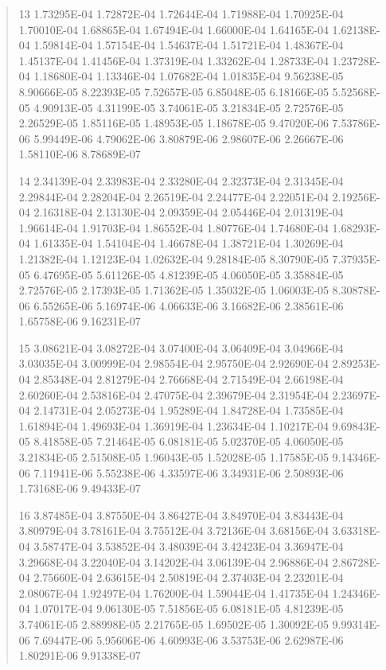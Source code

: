 \documentclass[letterpaper,10pt,english]{sphinxmanual}
\begin{document}
\begin{quote}
\begin{DUlineblock}{0em}
\item[] 13   1.73295E-04  1.72872E-04  1.72644E-04  1.71988E-04  1.70925E-04  1.70010E-04  1.68865E-04  1.67494E-04  1.66000E-04  1.64165E-04  1.62138E-04  1.59814E-04  1.57154E-04  1.54637E-04  1.51721E-04  1.48367E-04  1.45137E-04  1.41456E-04  1.37319E-04  1.33262E-04  1.28733E-04  1.23728E-04  1.18680E-04  1.13346E-04  1.07682E-04  1.01835E-04  9.56238E-05  8.90666E-05  8.22393E-05  7.52657E-05  6.85048E-05  6.18166E-05  5.52568E-05  4.90913E-05  4.31199E-05  3.74061E-05  3.21834E-05  2.72576E-05  2.26529E-05  1.85116E-05  1.48953E-05  1.18678E-05  9.47020E-06  7.53786E-06  5.99449E-06  4.79062E-06  3.80879E-06  2.98607E-06  2.26667E-06  1.58110E-06  8.78689E-07
\item[] 14   2.34139E-04  2.33983E-04  2.33280E-04  2.32373E-04  2.31345E-04  2.29844E-04  2.28204E-04  2.26519E-04  2.24477E-04  2.22051E-04  2.19256E-04  2.16318E-04  2.13130E-04  2.09359E-04  2.05446E-04  2.01319E-04  1.96614E-04  1.91703E-04  1.86552E-04  1.80776E-04  1.74680E-04  1.68293E-04  1.61335E-04  1.54104E-04  1.46678E-04  1.38721E-04  1.30269E-04  1.21382E-04  1.12123E-04  1.02632E-04  9.28184E-05  8.30790E-05  7.37935E-05  6.47695E-05  5.61126E-05  4.81239E-05  4.06050E-05  3.35884E-05  2.72576E-05  2.17393E-05  1.71362E-05  1.35032E-05  1.06003E-05  8.30878E-06  6.55265E-06  5.16974E-06  4.06633E-06  3.16682E-06  2.38561E-06  1.65758E-06  9.16231E-07
\item[] 15   3.08621E-04  3.08272E-04  3.07400E-04  3.06409E-04  3.04966E-04  3.03035E-04  3.00999E-04  2.98554E-04  2.95750E-04  2.92690E-04  2.89253E-04  2.85348E-04  2.81279E-04  2.76668E-04  2.71549E-04  2.66198E-04  2.60260E-04  2.53816E-04  2.47075E-04  2.39679E-04  2.31954E-04  2.23697E-04  2.14731E-04  2.05273E-04  1.95289E-04  1.84728E-04  1.73585E-04  1.61894E-04  1.49693E-04  1.36919E-04  1.23634E-04  1.10217E-04  9.69843E-05  8.41858E-05  7.21464E-05  6.08181E-05  5.02370E-05  4.06050E-05  3.21834E-05  2.51508E-05  1.96043E-05  1.52028E-05  1.17585E-05  9.14346E-06  7.11941E-06  5.55238E-06  4.33597E-06  3.34931E-06  2.50893E-06  1.73168E-06  9.49433E-07
\item[] 16   3.87485E-04  3.87550E-04  3.86427E-04  3.84970E-04  3.83443E-04  3.80979E-04  3.78161E-04  3.75512E-04  3.72136E-04  3.68156E-04  3.63318E-04  3.58747E-04  3.53852E-04  3.48039E-04  3.42423E-04  3.36947E-04  3.29668E-04  3.22040E-04  3.14202E-04  3.06139E-04  2.96886E-04  2.86728E-04  2.75660E-04  2.63615E-04  2.50819E-04  2.37403E-04  2.23201E-04  2.08067E-04  1.92497E-04  1.76200E-04  1.59044E-04  1.41735E-04  1.24346E-04  1.07017E-04  9.06130E-05  7.51856E-05  6.08181E-05  4.81239E-05  3.74061E-05  2.88998E-05  2.21765E-05  1.69502E-05  1.30092E-05  9.99314E-06  7.69447E-06  5.95606E-06  4.60993E-06  3.53753E-06  2.62987E-06  1.80291E-06  9.91338E-07

\end{DUlineblock}
\end{quote}
\end{document}
